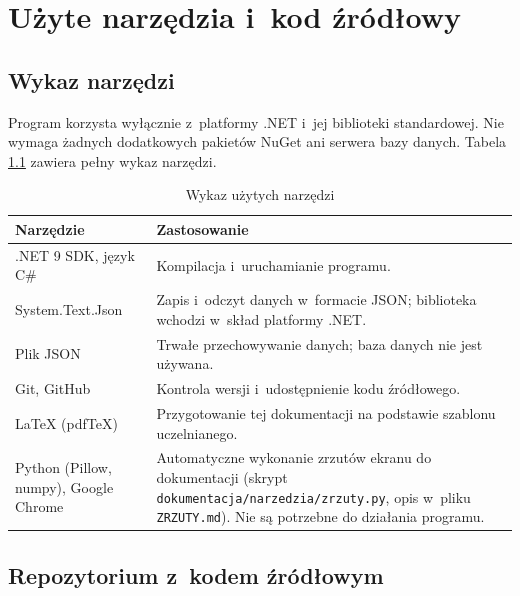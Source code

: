 \chapter{Użyte narzędzia i~kod źródłowy}\label{ch:narzedzia}

\section{Wykaz narzędzi}

Program korzysta wyłącznie z~platformy .NET i~jej biblioteki standardowej. Nie wymaga żadnych dodatkowych pakietów NuGet ani serwera bazy danych. Tabela \ref{tab:narzedzia} zawiera pełny wykaz narzędzi.

\begin{table}[H]
	\begin{center}
		\caption{\footnotesize Wykaz użytych narzędzi}
		\label{tab:narzedzia}
		\begin{small}
			\begin{tabular}{|l|p{10.5cm}|} \hline
				\textbf{Narzędzie} & \textbf{Zastosowanie} \\ \hline
				.NET 9 SDK, język C\# & Kompilacja i~uruchamianie programu. \\ \hline
				System.Text.Json & Zapis i~odczyt danych w~formacie JSON; biblioteka wchodzi w~skład platformy .NET. \\ \hline
				Plik JSON & Trwałe przechowywanie danych; baza danych nie jest używana. \\ \hline
				Git, GitHub & Kontrola wersji i~udostępnienie kodu źródłowego. \\ \hline
				LaTeX (pdfTeX) & Przygotowanie tej dokumentacji na podstawie szablonu uczelnianego. \\ \hline
				Python (Pillow, numpy), Google Chrome & Automatyczne wykonanie zrzutów ekranu do dokumentacji (skrypt \texttt{dokumentacja/narzedzia/zrzuty.py}, opis w~pliku \texttt{ZRZUTY.md}). Nie są potrzebne do działania programu. \\ \hline
			\end{tabular}
		\end{small}
	\end{center}
\end{table}

\section{Repozytorium z~kodem źródłowym}

